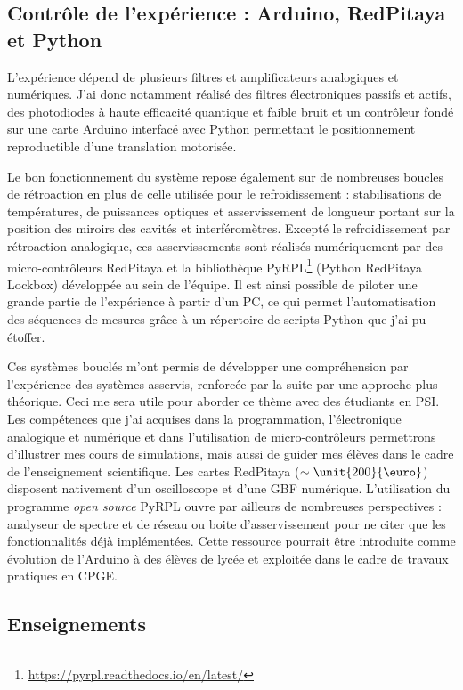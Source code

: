\documentclass[12pt,a4paper]{article}
\begin{document}
\subsection{Contrôle de l'expérience : Arduino, RedPitaya et Python}
\label{sec:controls}

L'expérience dépend de plusieurs filtres et amplificateurs analogiques et numériques.
J'ai donc notamment réalisé des filtres électroniques passifs et actifs, des photodiodes à haute efficacité quantique et faible bruit et un contrôleur fondé sur une carte Arduino interfacé avec Python permettant le positionnement reproductible d'une translation motorisée.

Le bon fonctionnement du système repose également sur de nombreuses boucles de rétroaction en plus de celle utilisée pour le refroidissement : stabilisations de températures, de puissances optiques et asservissement de longueur portant sur la position des miroirs des cavités et interféromètres.
Excepté le refroidissement par rétroaction analogique, ces asservissements sont réalisés numériquement par des micro-contrôleurs RedPitaya et la bibliothèque PyRPL\footnote{\url{https://pyrpl.readthedocs.io/en/latest/}} (Python RedPitaya Lockbox) développée au sein de l'équipe.
Il est ainsi possible de piloter une grande partie de l'expérience à partir d'un PC, ce qui permet l'automatisation des séquences de mesures grâce à un répertoire de scripts Python que j'ai pu étoffer.

Ces systèmes bouclés m'ont permis de développer une compréhension par l'expérience des systèmes asservis, renforcée par la suite par une approche plus théorique.
Ceci me sera utile pour aborder ce thème avec des étudiants en PSI.
Les compétences que j'ai acquises dans la programmation, l'électronique analogique et numérique et dans l'utilisation de micro-contrôleurs permettrons d'illustrer mes cours de simulations, mais aussi de guider mes élèves dans le cadre de l'enseignement scientifique.
Les cartes RedPitaya ($\sim\unit{200}{\text{\euro}}$) disposent nativement d'un oscilloscope et d'une GBF numérique.
L'utilisation du programme \textit{open source} PyRPL ouvre par ailleurs de nombreuses perspectives :  analyseur de spectre et de réseau ou boite d'asservissement pour ne citer que les fonctionnalités déjà implémentées.
Cette ressource pourrait être introduite comme évolution de l'Arduino à des élèves de lycée et exploitée dans le cadre de travaux pratiques en CPGE.

\subsection{Enseignements}
\end{document}

